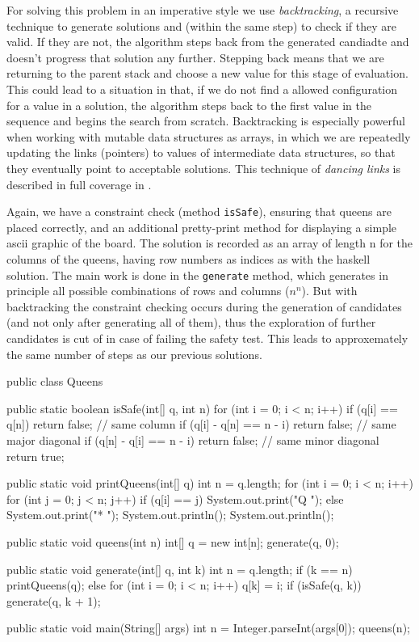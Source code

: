 For solving this problem in an imperative style we use \emph{backtracking}, a recursive technique to generate solutions and (within the same step) to check if they are valid.
If they are not, the algorithm steps back from the generated candiadte and doesn't progress that solution any further.
Stepping back means that we are returning to the parent stack and choose a new value for this stage of evaluation.
This could lead to a situation in that, if we do not find a allowed configuration for a value in a solution, the algorithm steps back to the first value in the sequence and begins the search from scratch.
Backtracking is especially powerful when working with mutable data structures as arrays, in which we are repeatedly updating the links (pointers) to values of intermediate data structures, so that they eventually point to acceptable solutions.
This technique of \emph{dancing links} is described in full coverage in \autocite{taocp19}.

\begin{impl}
Again, we have a constraint check (method \texttt{isSafe}), ensuring that queens are placed correctly, and an additional pretty-print method for displaying a simple ascii graphic of the board.
The solution is recorded as an array of length n for the columns of the queens, having row numbers as indices as with the haskell solution.
The main work is done in the \texttt{generate} method, which generates in principle all possible combinations of rows and columns ($n^n$).
But with backtracking the constraint checking occurs during the generation of candidates (and not only after generating all of them), thus the exploration of further candidates is cut of in case of failing the safety test.
This leads to approxemately the same number of steps as our previous solutions.
\end{impl}

\begin{javacode}
public class Queens {
  public static boolean isSafe(int[] q, int n) {
    for (int i = 0; i < n; i++) {
      if (q[i] == q[n]) return false;         // same column
      if (q[i] - q[n] == n - i) return false; // same major diagonal
      if (q[n] - q[i] == n - i) return false; // same minor diagonal
    }
    return true;
  }

  public static void printQueens(int[] q) {
    int n = q.length;
    for (int i = 0; i < n; i++) {
      for (int j = 0; j < n; j++) {
        if (q[i] == j) System.out.print("Q ");
        else           System.out.print("* ");
      }
      System.out.println();
    }
    System.out.println();
  }

  public static void queens(int n) {
    int[] q = new int[n];
    generate(q, 0);
  }

  public static void generate(int[] q, int k) {
    int n = q.length;
    if (k == n) printQueens(q);
    else {
      for (int i = 0; i < n; i++) {
        q[k] = i;
        if (isSafe(q, k)) generate(q, k + 1);
      }
    }
  }

  public static void main(String[] args) {
    int n = Integer.parseInt(args[0]);
    queens(n);
  }
}
\end{javacode}

